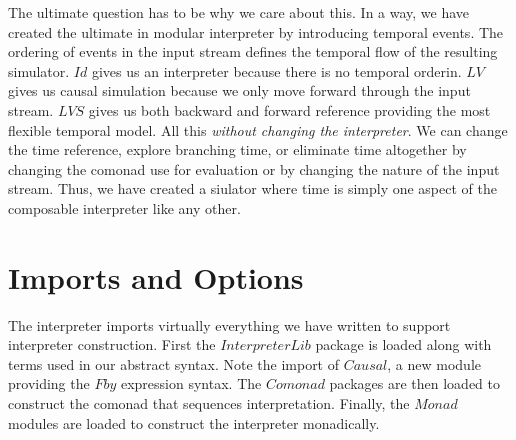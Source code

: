\documentclass[10pt]{article}
\newcommand{\Conid}[1]{\mathit{#1}}
\begin{document}
The ultimate question has to be why we care about this.  In a way, we
have created the ultimate in modular interpreter by introducing
temporal events.  The ordering of events in the input stream defines
the temporal flow of the resulting simulator.  \ensuremath{\Conid{Id}} gives us an
interpreter because there is no temporal orderin.  \ensuremath{\Conid{LV}} gives us
causal simulation because we only move forward through the input
stream.  \ensuremath{\Conid{LVS}} gives us both backward and forward reference providing
the most flexible temporal model.  All this \emph{without changing the
interpreter}.  We can change the time reference, explore branching
time, or eliminate time altogether by changing the comonad use for
evaluation or by changing the nature of the input stream.  Thus, we
have created a siulator where time is simply one aspect of the
composable interpreter like any other.

\section{Imports and Options}

The interpreter imports virtually everything we have written to
support interpreter construction.  First the \ensuremath{\Conid{InterpreterLib}} package
is loaded along with terms used in our abstract syntax.  Note the
import of \ensuremath{\Conid{Causal}}, a new module providing the \ensuremath{\Conid{Fby}} expression
syntax.  The \ensuremath{\Conid{Comonad}} packages are then loaded to construct the
comonad that sequences interpretation.  Finally, the \ensuremath{\Conid{Monad}} modules
are loaded to construct the interpreter monadically.
\end{document}

